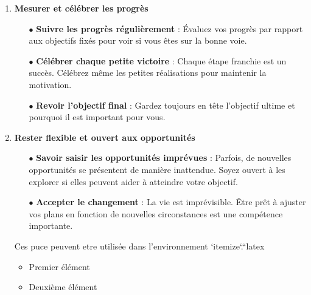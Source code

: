 \documentclass[a4paper,12pt]{article} %
\begin{document}
\begin{enumerate}[label=\textbf{\arabic*.}]
    \item \textbf{Mesurer et célébrer les progrès}
    \begin{itemize}
        \item [$\bullet$]\textbf{Suivre les progrès régulièrement} : Évaluez vos progrès par rapport aux objectifs fixés pour voir si vous êtes sur la bonne voie.
        \item [$\bullet$]\textbf{Célébrer chaque petite victoire} : Chaque étape franchie est un succès. Célébrez même les petites réalisations pour maintenir la motivation.
        \item [$\bullet$]\textbf{Revoir l'objectif final} : Gardez toujours en tête l'objectif ultime et pourquoi il est important pour vous.
    \end{itemize}

    \item \textbf{Rester flexible et ouvert aux opportunités}
    \begin{itemize}
        \item [$\bullet$]\textbf{Savoir saisir les opportunités imprévues} : Parfois, de nouvelles opportunités se présentent de manière inattendue. Soyez ouvert à les explorer si elles peuvent aider à atteindre votre objectif.
        \item [$\bullet$]\textbf{Accepter le changement} : La vie est imprévisible. Être prêt à ajuster vos plans en fonction de nouvelles circonstances est une compétence importante.
    \end{itemize}
    

Ces puce peuvent etre utilisée dans l'environnement `itemize`.``latex
\begin{itemize}
    \item Premier élément
    \item Deuxième élément
\end{itemize}%


\end{enumerate}
\end{document}
